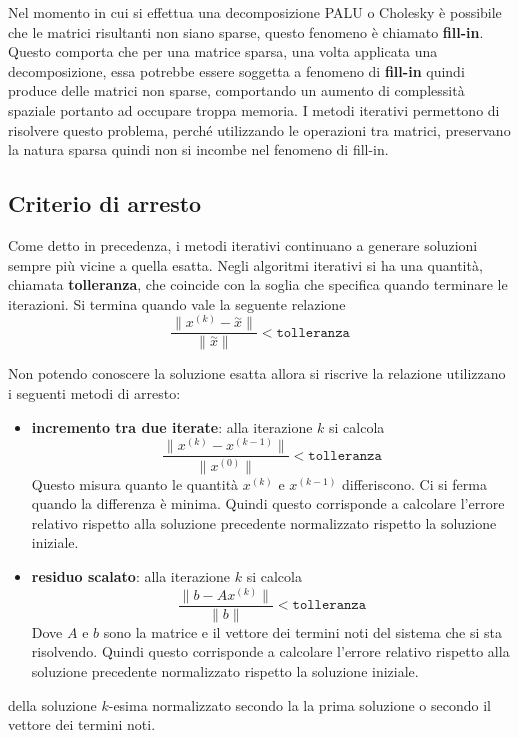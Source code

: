 Nel momento in cui si effettua una decomposizione PALU o Cholesky è possibile che 
le matrici risultanti non siano sparse, questo fenomeno è chiamato \textbf{fill-in}.
Questo comporta che per una matrice sparsa, una volta applicata una decomposizione,
essa potrebbe essere soggetta a fenomeno di \textbf{fill-in} quindi produce 
delle matrici non sparse, comportando un aumento di complessità spaziale portanto 
ad occupare troppa memoria. I metodi iterativi permettono di risolvere questo problema,
perché utilizzando le operazioni tra matrici, preservano la natura sparsa quindi 
non si incombe nel fenomeno di fill-in.

\subsection{Criterio di arresto}
Come detto in precedenza, i metodi iterativi continuano a generare soluzioni sempre 
più vicine a quella esatta. 
Negli algoritmi iterativi si ha una quantità, chiamata \textbf{tolleranza}, che
coincide con la soglia che specifica quando terminare le iterazioni. Si termina 
quando vale la seguente relazione
$$\frac{\|x^{(k)}-\stackrel{\sim}{x}\|}{\|\stackrel{\sim}{x}\|} < \texttt{tolleranza}$$

Non potendo conoscere la soluzione esatta allora si riscrive la relazione utilizzano i seguenti metodi 
di arresto:
\begin{itemize}
    \item \textbf{incremento tra due iterate}: alla iterazione $k$ si calcola
    $$\frac{\|x^{(k)}-x^{(k-1)}\|}{\|x^{(0)}\|}< \texttt{tolleranza}$$
    Questo misura quanto le quantità $x^{(k)}$ e $x^{(k-1)}$ differiscono. Ci si 
    ferma quando la differenza è minima. Quindi questo corrisponde a calcolare l'errore relativo rispetto alla soluzione 
    precedente normalizzato rispetto la soluzione iniziale.
    \item \textbf{residuo scalato}: alla iterazione $k$ si calcola
    $$\frac{\|b- Ax^{(k)}\|}{\|b\|}< \texttt{tolleranza}$$
    Dove $A$ e $b$ sono la matrice e il vettore dei termini noti del sistema che 
    si sta risolvendo. Quindi questo corrisponde a calcolare l'errore relativo rispetto alla soluzione 
    precedente normalizzato rispetto la soluzione iniziale.
    
\end{itemize}

 della soluzione $k$-esima
normalizzato secondo la la prima soluzione o secondo il vettore dei termini noti.

